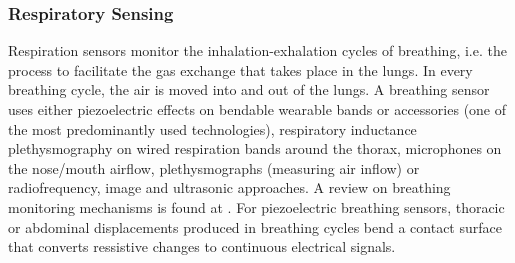 %
%

\subsubsection{Respiratory Sensing}

Respiration sensors monitor the inhalation-exhalation cycles of breathing, i.e. the process to facilitate the gas exchange that takes place in the lungs. In every breathing cycle, the air is moved into and out of the lungs. A breathing sensor uses either piezoelectric effects on bendable wearable bands or accessories (one of the most predominantly used technologies), respiratory inductance plethysmography on wired respiration bands around the thorax, microphones on the nose/mouth airflow, plethysmographs (measuring air inflow) or radiofrequency, image and ultrasonic approaches. A review on breathing monitoring mechanisms is found at \cite{massaroni_contact-based_2019}. For piezoelectric breathing sensors, thoracic or abdominal displacements produced in breathing cycles bend a contact surface that converts ressistive changes to continuous electrical signals.


